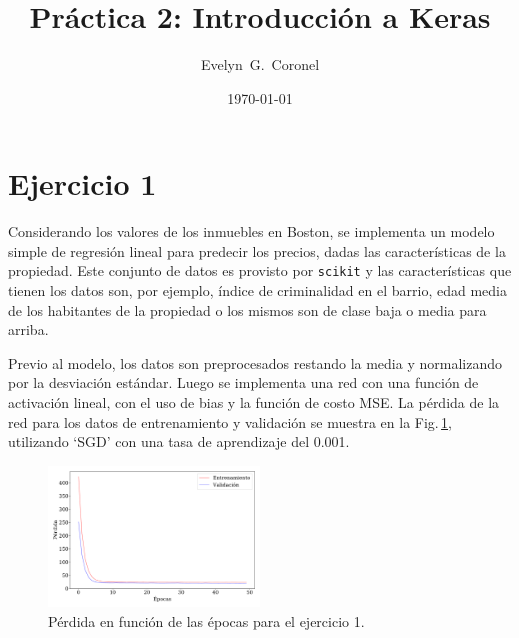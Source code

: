 
\usepackage{multirow}


\title{Práctica 2: Introducción a Keras}
\author{Evelyn~G.~Coronel}


\date[]{\lowercase{\today}} 

\maketitle

\section*{Ejercicio 1}

Considerando los valores de los inmuebles en Boston, se implementa un modelo simple de regresión lineal para predecir los precios, dadas las características de la propiedad. Este conjunto de datos es provisto por \verb|scikit| y las características que tienen los datos son, por ejemplo, índice de criminalidad en el barrio, edad media de los habitantes de la propiedad o los mismos son de clase baja o media para arriba.


Previo al modelo, los datos son preprocesados restando la media y normalizando por la desviación estándar. Luego se implementa una red con una función de activación lineal, con el uso de bias y la función de costo MSE. La pérdida de la red para los datos de entrenamiento y validación se muestra en la Fig.\,\ref{fig:ejer1_loss}, utilizando `SGD' con una tasa de aprendizaje del 0.001.


\begin{figure}[H]
    \begin{small}
        \begin{center}
            \includegraphics[width=0.5\textwidth]{Graphs/ejer1_loss.pdf}
        \end{center}
        \caption{Pérdida en función de las épocas para el ejercicio 1.}
        \label{fig:ejer1_loss}
    \end{small}
\end{figure}

